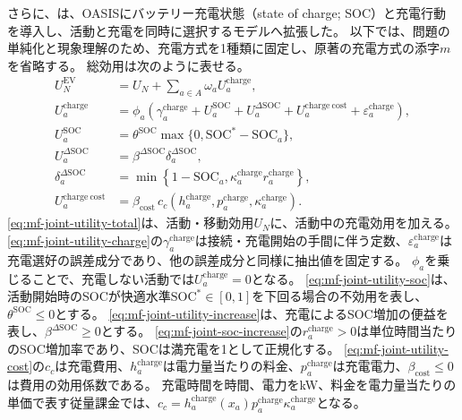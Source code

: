 さらに、\citet{wang2025joint}は、OASISにバッテリー充電状態（state of charge; SOC）と充電行動を導入し、活動と充電を同時に選択するモデルへ拡張した。
以下では、問題の単純化と現象理解のため、充電方式を1種類に固定し、原著の充電方式の添字$m$を省略する。
総効用は次のように表せる。
\begin{subequations}
\label{eq:mf-joint-utility}
\begin{align}
 U_N^{\mathrm{EV}}
 &=U_N+\sum_{a\in A}\omega_a U_a^{\mathrm{charge}},
 \label{eq:mf-joint-utility-total}\\
U_a^{\mathrm{charge}}
 &=\phi_a\left(\gamma_a^{\mathrm{charge}}+U_a^{\mathrm{SOC}}
 +U_a^{\Delta\mathrm{SOC}}+U_a^{\mathrm{charge\ cost}}
 +\varepsilon_a^{\mathrm{charge}}\right),
 \label{eq:mf-joint-utility-charge}\\
 U_a^{\mathrm{SOC}}
 &=\theta^{\mathrm{SOC}}\max\{0,\mathrm{SOC}^*-\mathrm{SOC}_a\},
 \label{eq:mf-joint-utility-soc}\\
 U_a^{\Delta\mathrm{SOC}}
 &=\beta^{\Delta\mathrm{SOC}}\delta_a^{\Delta\mathrm{SOC}},
 \label{eq:mf-joint-utility-increase}\\
 \delta_a^{\Delta\mathrm{SOC}}
 &=\min\left\{1-\mathrm{SOC}_a,
 \kappa_a^{\mathrm{charge}}r_a^{\mathrm{charge}}\right\},
 \label{eq:mf-joint-soc-increase}\\
 U_a^{\mathrm{charge\ cost}}
 &=\beta_{\mathrm{cost}}\,
 c_c\!\left(h_a^{\mathrm{charge}},
 p_a^{\mathrm{charge}},\kappa_a^{\mathrm{charge}}\right).
 \label{eq:mf-joint-utility-cost}
\end{align}
\end{subequations}
\eqref{eq:mf-joint-utility-total}は、活動・移動効用$U_N$に、活動中の充電効用を加える。
\eqref{eq:mf-joint-utility-charge}の$\gamma_a^{\mathrm{charge}}$は接続・充電開始の手間に伴う定数、$\varepsilon_a^{\mathrm{charge}}$は充電選好の誤差成分であり、他の誤差成分と同様に抽出値を固定する。
$\phi_a$を乗じることで、充電しない活動では$U_a^{\mathrm{charge}}=0$となる。
\eqref{eq:mf-joint-utility-soc}は、活動開始時のSOCが快適水準$\mathrm{SOC}^*\in[0,1]$を下回る場合の不効用を表し、$\theta^{\mathrm{SOC}}\le0$とする。
\eqref{eq:mf-joint-utility-increase}は、充電によるSOC増加の便益を表し、$\beta^{\Delta\mathrm{SOC}}\ge0$とする。
\eqref{eq:mf-joint-soc-increase}の$r_a^{\mathrm{charge}}>0$は単位時間当たりのSOC増加率であり、SOCは満充電を1として正規化する。
\eqref{eq:mf-joint-utility-cost}の$c_c$は充電費用、$h_a^{\mathrm{charge}}$は電力量当たりの料金、$p_a^{\mathrm{charge}}$は充電電力、$\beta_{\mathrm{cost}}\le0$は費用の効用係数である。
充電時間を時間、電力をkW、料金を電力量当たりの単価で表す従量課金では、$c_c=h_a^{\mathrm{charge}}(x_a)p_a^{\mathrm{charge}}\kappa_a^{\mathrm{charge}}$となる。

